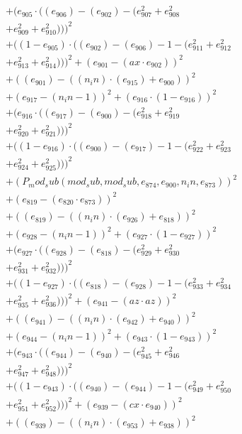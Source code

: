 \documentclass[10pt, a4paper]{article}
\begin{document}
\begin{small}
\begin{align*}
& + (e_{905}  \cdot  ((e_{906}) - (e_{902}) - (e_{907}^{2} + e_{908}^{2} \\
& + e_{909}^{2} + e_{910}^{2})))^{2} \\
& + ((1 - e_{905})  \cdot  ((e_{902}) - (e_{906}) - 1 - (e_{911}^{2} + e_{912}^{2} \\
& + e_{913}^{2} + e_{914}^{2})))^{2} + (e_{901} - (ax  \cdot  e_{902}))^{2} \\
& + ((e_{901}) - ((n_in)  \cdot  (e_{915}) + e_{900}))^{2} \\
& + (e_{917} - (n_in - 1))^{2} + (e_{916}  \cdot  (1 - e_{916}))^{2} \\
& + (e_{916}  \cdot  ((e_{917}) - (e_{900}) - (e_{918}^{2} + e_{919}^{2} \\
& + e_{920}^{2} + e_{921}^{2})))^{2} \\
& + ((1 - e_{916})  \cdot  ((e_{900}) - (e_{917}) - 1 - (e_{922}^{2} + e_{923}^{2} \\
& + e_{924}^{2} + e_{925}^{2})))^{2} \\
& + (P_mod_sub(mod_sub, mod_sub, e_{874}, e_{900}, n_in, e_{873}))^{2} \\
& + (e_{819} - (e_{820}  \cdot  e_{873}))^{2} \\
& + ((e_{819}) - ((n_in)  \cdot  (e_{926}) + e_{818}))^{2} \\
& + (e_{928} - (n_in - 1))^{2} + (e_{927}  \cdot  (1 - e_{927}))^{2} \\
& + (e_{927}  \cdot  ((e_{928}) - (e_{818}) - (e_{929}^{2} + e_{930}^{2} \\
& + e_{931}^{2} + e_{932}^{2})))^{2} \\
& + ((1 - e_{927})  \cdot  ((e_{818}) - (e_{928}) - 1 - (e_{933}^{2} + e_{934}^{2} \\
& + e_{935}^{2} + e_{936}^{2})))^{2} + (e_{941} - (az  \cdot  az))^{2} \\
& + ((e_{941}) - ((n_in)  \cdot  (e_{942}) + e_{940}))^{2} \\
& + (e_{944} - (n_in - 1))^{2} + (e_{943}  \cdot  (1 - e_{943}))^{2} \\
& + (e_{943}  \cdot  ((e_{944}) - (e_{940}) - (e_{945}^{2} + e_{946}^{2} \\
& + e_{947}^{2} + e_{948}^{2})))^{2} \\
& + ((1 - e_{943})  \cdot  ((e_{940}) - (e_{944}) - 1 - (e_{949}^{2} + e_{950}^{2} \\
& + e_{951}^{2} + e_{952}^{2})))^{2} + (e_{939} - (cx  \cdot  e_{940}))^{2} \\
& + ((e_{939}) - ((n_in)  \cdot  (e_{953}) + e_{938}))^{2} \\

\end{align*}
\end{small}
\end{document}
